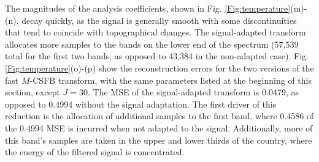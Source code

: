 \documentclass[journal, 10pt]{IEEEtran}
\begin{document}
The magnitudes of the analysis coefficients, shown in Fig. \ref{Fig:temperature}(m)-(n), decay quickly, %
as the signal is generally smooth with some discontinuities that tend to coincide with topographical changes. %
The signal-adapted transform allocates more samples to the bands on the lower end of the spectrum (57,539 total for the first two bands, as opposed to 43,384 in the non-adapted case).
Fig. \ref{Fig:temperature}(o)-(p) show the reconstruction errors for the two versions of the fast $M$-CSFB transform, with the same parameters listed at the beginning of this section, except $J=30$. The MSE of the signal-adapted transform is 0.0479, as opposed to 0.4994 without the signal adaptation. The first driver of this reduction is the allocation of additional samples to the first band, where 0.4586 of the 0.4994 MSE is incurred when not adapted to the signal. Additionally, more of this band's samples %
are taken in the upper and lower thirds of the country, where the energy of the filtered signal is concentrated. 








\end{document}
